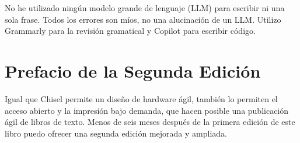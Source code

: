 \documentclass[%
    10pt,
    headinclude, footinclude=false,
    openright, %
    notitlepage,
    cleardoublepage=empty,
    headsepline,
    numbers=noenddot,
    bibliography=totoc, index=totoc,
    ]{scrbook}
\begin{document}

No he utilizado ningún modelo grande de lenguaje (LLM) para escribir ni una sola frase. Todos los errores son míos, 
no una alucinación de un LLM. Utilizo Grammarly para la revisión gramatical y Copilot para escribir código.




\section*{Prefacio de la Segunda Edición}


Igual que Chisel permite un diseño de hardware ágil, también lo permiten el acceso abierto y la impresión bajo demanda, 
que hacen posible una publicación ágil de libros de texto. Menos de seis meses después de la primera edición de este 
libro puedo ofrecer una segunda edición mejorada y ampliada.

\end{document}
